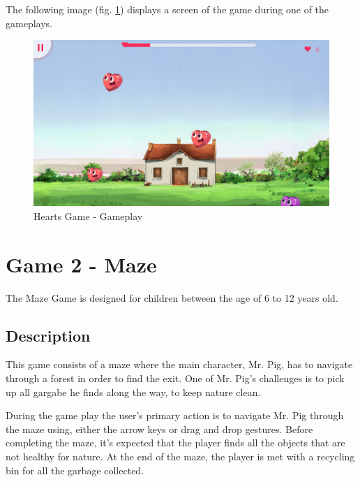 

The following image (fig. \ref{fig:heartsGameplay}) displays a screen of the game during one of the gameplays.

\begin{figure}[H]
    \centering
    \includegraphics[scale=0.45]{Chapters/gameplay/HeartsGame.png}
    \caption{Hearts Game - Gameplay}
    \label{fig:heartsGameplay}    
\end{figure}


\section{Game 2 - Maze}
\label{c3Maze}

The Maze Game is designed for children between the age of 6 to 12 years old.

\subsection*{Description}

This game consists of a maze where the main character, Mr. Pig, has to navigate through a forest in order to find the exit. One of Mr. Pig's challenges is to pick up all gargabe he finds along the way, to keep nature clean.

During the game play the user's primary action is to navigate Mr. Pig through the maze using, either the arrow keys or drag and drop gestures. Before completing the maze, it's expected that the player finds all the objects that are not healthy for nature.
At the end of the maze, the player is met with a recycling bin for all the garbage collected.

